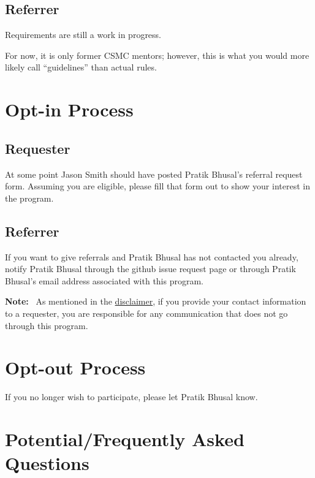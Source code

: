 \documentclass[letterpaper, 12pt]{article}
\newcommand{\currentBoss}{Jason Smith}
\newcommand{\note}[1]{\textbf{Note:}~#1}
\begin{document}
\subsection{Referrer}

Requirements are still a work in progress.

For now, it is only former CSMC mentors; however, this is what you would more
likely call ``guidelines'' than actual rules.

\section{Opt-in Process}

\subsection{Requester}

At some point \currentBoss{} should have posted Pratik Bhusal's referral request
form. Assuming you are eligible, please fill that form out to show your interest
in the program.

\subsection{Referrer}

If you want to give referrals and Pratik Bhusal has not contacted you already,
notify Pratik Bhusal through the github issue request page or through Pratik
Bhusal's email address associated with this program.

\note{%
    As mentioned in the \hyperref[section:disclaimer:spamMessages]{disclaimer},
    if you provide your contact information to a requester, you are responsible
    for any communication that does not go through this program.
}

\section{Opt-out Process}

If you no longer wish to participate, please let Pratik Bhusal know.

\section{Potential/Frequently Asked Questions}
\end{document}
